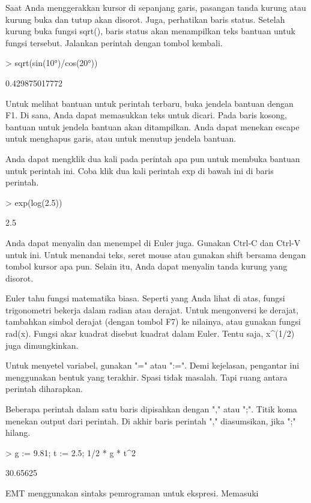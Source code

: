 \documentclass[a4paper,10pt]{article}
\begin{document}
\begin{eulernotebook}
\begin{eulercomment}
\begin{eulercomment}
\begin{eulercomment}
Saat Anda menggerakkan kursor di sepanjang garis, pasangan tanda
kurung atau kurung buka dan tutup akan disorot. Juga, perhatikan baris
status. Setelah kurung buka fungsi sqrt(), baris status akan
menampilkan teks bantuan untuk fungsi tersebut. Jalankan perintah
dengan tombol kembali.
\end{eulercomment}
\begin{eulerprompt}
> sqrt(sin(10°)/cos(20°))
\end{eulerprompt}
\begin{euleroutput}
  0.429875017772
\end{euleroutput}
\begin{eulercomment}
Untuk melihat bantuan untuk perintah terbaru, buka jendela bantuan
dengan F1. Di sana, Anda dapat memasukkan teks untuk dicari. Pada
baris kosong, bantuan untuk jendela bantuan akan ditampilkan. Anda
dapat menekan escape untuk menghapus garis, atau untuk menutup jendela
bantuan.

Anda dapat mengklik dua kali pada perintah apa pun untuk membuka
bantuan untuk perintah ini. Coba klik dua kali perintah exp di bawah
ini di baris perintah.
\end{eulercomment}
\begin{eulerprompt}
> exp(log(2.5)) 
\end{eulerprompt}
\begin{euleroutput}
  2.5
\end{euleroutput}
\begin{eulercomment}
Anda dapat menyalin dan menempel di Euler juga. Gunakan Ctrl-C dan
Ctrl-V untuk ini. Untuk menandai teks, seret mouse atau gunakan shift
bersama dengan tombol kursor apa pun. Selain itu, Anda dapat menyalin
tanda kurung yang disorot.
\end{eulercomment}
\begin{eulercomment}
Euler tahu fungsi matematika biasa. Seperti yang Anda lihat di atas,
fungsi trigonometri bekerja dalam radian atau derajat. Untuk
mengonversi ke derajat, tambahkan simbol derajat (dengan tombol F7) ke
nilainya, atau gunakan fungsi rad(x). Fungsi akar kuadrat disebut
kuadrat dalam Euler. Tentu saja, x\textasciicircum{}(1/2) juga dimungkinkan.

Untuk menyetel variabel, gunakan "=" atau ":=". Demi kejelasan,
pengantar ini menggunakan bentuk yang terakhir. Spasi tidak masalah.
Tapi ruang antara perintah diharapkan.

Beberapa perintah dalam satu baris dipisahkan dengan "," atau ";".
Titik koma menekan output dari perintah. Di akhir baris perintah ","
diasumsikan, jika ";" hilang.
\end{eulercomment}
\begin{eulerprompt}
> g := 9.81; t := 2.5; 1/2 * g * t^2
\end{eulerprompt}
\begin{euleroutput}
  30.65625
\end{euleroutput}
\begin{eulercomment}
EMT menggunakan sintaks pemrograman untuk ekspresi. Memasuki


\end{eulercomment}
\end{eulercomment}
\end{eulercomment}
\end{eulernotebook}
\end{document}

